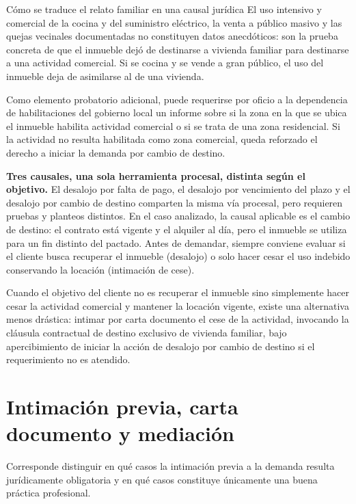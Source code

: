 \documentclass[12pt,oneside]{book}
\begin{document}
\begin{example}{Cómo se traduce el relato familiar en una causal jurídica}
El uso intensivo y comercial de la cocina y del suministro eléctrico, la venta a público masivo y las quejas vecinales documentadas no constituyen datos anecdóticos: son la prueba concreta de que el inmueble dejó de destinarse a vivienda familiar para destinarse a una actividad comercial. Si se cocina y se vende a gran público, el uso del inmueble deja de asimilarse al de una vivienda.
\end{example}

Como elemento probatorio adicional, puede requerirse por oficio a la dependencia de habilitaciones del gobierno local un informe sobre si la zona en la que se ubica el inmueble habilita actividad comercial o si se trata de una zona residencial. Si la actividad no resulta habilitada como zona comercial, queda reforzado el derecho a iniciar la demanda por cambio de destino.

\begin{important}
\textbf{Tres causales, una sola herramienta procesal, distinta según el objetivo.} El desalojo por falta de pago, el desalojo por vencimiento del plazo y el desalojo por cambio de destino comparten la misma vía procesal, pero requieren pruebas y planteos distintos. En el caso analizado, la causal aplicable es el cambio de destino: el contrato está vigente y el alquiler al día, pero el inmueble se utiliza para un fin distinto del pactado. Antes de demandar, siempre conviene evaluar si el cliente busca recuperar el inmueble (desalojo) o solo hacer cesar el uso indebido conservando la locación (intimación de cese).
\end{important}

Cuando el objetivo del cliente no es recuperar el inmueble sino simplemente hacer cesar la actividad comercial y mantener la locación vigente, existe una alternativa menos drástica: intimar por carta documento el cese de la actividad, invocando la cláusula contractual de destino exclusivo de vivienda familiar, bajo apercibimiento de iniciar la acción de desalojo por cambio de destino si el requerimiento no es atendido.

\section{Intimación previa, carta documento y mediación}

Corresponde distinguir en qué casos la intimación previa a la demanda resulta jurídicamente obligatoria y en qué casos constituye únicamente una buena práctica profesional.
\end{document}
